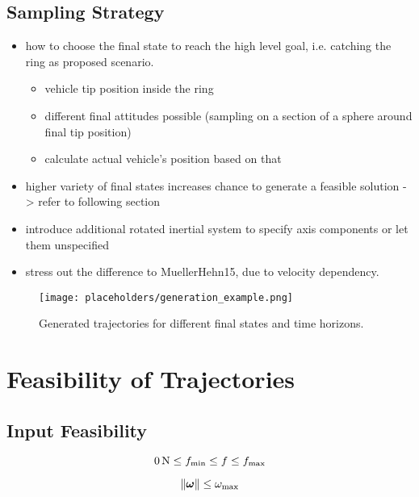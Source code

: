 \subsection{Sampling Strategy}
\begin{itemize}
	\color{red}
	\item how to choose the final state to reach the high level goal, i.e. catching the ring as proposed scenario.
	\begin{itemize}
		\item vehicle tip position inside the ring
		\item different final attitudes possible (sampling on a section of a sphere around final tip position)
		\item calculate actual vehicle's position based on that
	\end{itemize}
	\item higher variety of final states increases chance to generate a feasible solution -> refer to following section
	\item introduce additional rotated inertial system to specify axis components or let them unspecified
	\item stress out the difference to MuellerHehn15, due to velocity dependency.
\end{itemize}
\begin{figure}[h!]
	\centering
	\texttt{[image: placeholders/generation\_example.png]}
	\caption{Generated trajectories for different final states and time horizons.}
\end{figure}
\section{Feasibility of Trajectories}
\label{sec:feasibility}



\subsection{Input Feasibility}

\begin{equation}
	\label{eq:thrust-limits}
	\unit[0]{N} \leq f_\text{min} \leq f \leq f_\text{max}
\end{equation}

\begin{equation}
	\label{eq:body-rates-limit}
	\left\lVert\mbox{$\bm{\omega}$}\right\rVert
	\leq
	\omega_\text{max}
\end{equation}


